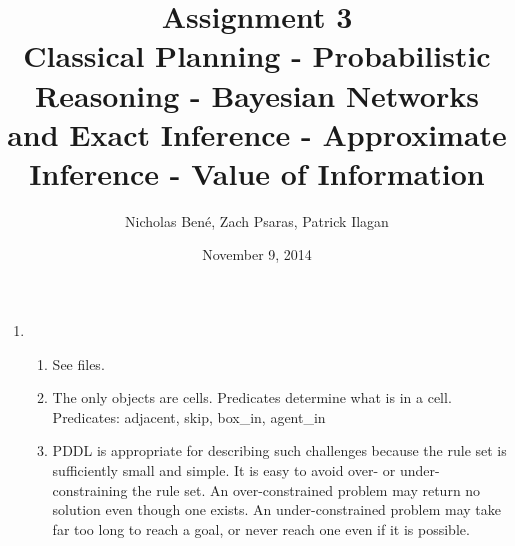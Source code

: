 \documentclass[12pt,a4paper]{report}
\begin{document}
\title{Assignment 3 \\ \small{Classical Planning - Probabilistic Reasoning - Bayesian Networks and Exact Inference - Approximate Inference - Value of Information}}

\author{Nicholas Ben\'e, Zach Psaras, Patrick Ilagan}
\date{November 9, 2014}
\maketitle

\begin{enumerate}
	
\item	
\begin{enumerate}
	\item See files.
	
	\item
	The only objects are cells. Predicates determine what is in a cell. \\
	Predicates: adjacent, skip, box\_in, agent\_in
	
	\item
	PDDL is appropriate for describing such challenges because the rule set is sufficiently small and simple. It is easy to avoid over- or under-constraining the rule set. An over-constrained problem may return no solution even though one exists. An under-constrained problem may take far too long to reach a goal, or never reach one even if it is possible.
	
\end{enumerate}


\end{enumerate}
\end{document}
